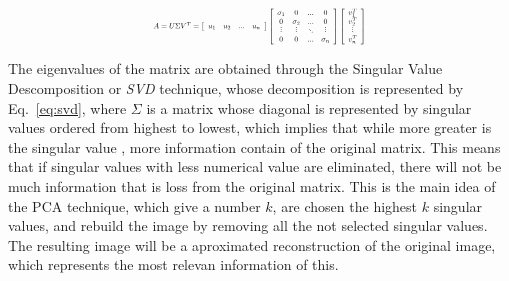 \documentclass[journal]{IEEEtran}
\begin{document}
\begin{equation}
\label{eq:svd}
\resizebox{.44\textwidth}{!} 
{$
	A = U\Sigma V^T = \left[ \begin{array}{cccc} u_1 & u_2 & ... & u_n \end{array} \right]  
	 \left[ \begin{array}{cccc} 
	 	\sigma_1 & 0 & ... & 0 \\
	 	0 & \sigma_2 & ... & 0 \\
	 	\rotatebox{90}{...} &\rotatebox{90}{...} & \rotatebox{135}{...} & \rotatebox{90}{...} \\
	 	0 & 0 & ... & \sigma_n \\
	 \end{array} \right] 
	\left[ \begin{array}{c} 
		v_1^T \\
		v_2^T \\
		\rotatebox{90}{...} \\
		v_n^T \\
	\end{array} \right] 
$}
\end{equation}

The eigenvalues of the matrix are obtained through the Singular Value Descomposition or \textit{{SVD}} technique, whose decomposition is represented by  Eq.~\ref{eq:svd}, where  $\Sigma$ is a matrix whose diagonal is represented by singular values ordered from highest to lowest, which implies that while more greater is the singular value , more information contain of the original matrix. This means that if singular values with less numerical value are eliminated, there will not be much information that is loss from the original matrix.  This is the main idea of the PCA technique, which give a number $k$, are chosen the highest $k$ singular values, and rebuild the image by removing all the not selected singular values. The resulting image will be a aproximated reconstruction of the original image, which represents the most relevan information of this.
\end{document}
